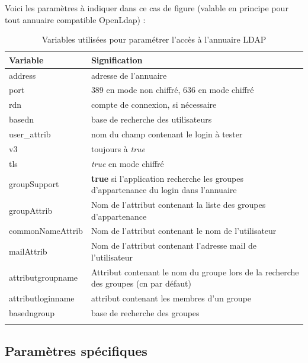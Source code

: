 Voici les paramètres à indiquer dans ce cas de figure (valable en principe pour tout annuaire compatible OpenLdap) : 
\begin{longtable}{|p{4cm}|p{11cm}|}
\hline
\textbf{Variable} & \textbf{Signification} \\
\hline
\endhead
address &  adresse de l'annuaire\\
\hline
port & 389 en mode non chiffré, 636 en mode chiffré\\
\hline
rdn & compte de connexion, si nécessaire \\
\hline
basedn & base de recherche des utilisateurs\\
\hline
user\_attrib & nom du champ contenant le login à tester\\
\hline
v3 & toujours à \textit{true}\\
\hline
tls & \textit{true} en mode chiffré\\
\hline
groupSupport & \textbf{true} si l'application recherche les groupes d'appartenance du login dans l'annuaire\\
\hline
groupAttrib & Nom de l'attribut contenant la liste des groupes d'appartenance\\
\hline
commonNameAttrib & Nom de l'attribut contenant le nom de l'utilisateur\\
\hline
mailAttrib & Nom de l'attribut contenant l'adresse mail de l'utilisateur\\
\hline
attributgroupname & Attribut contenant le nom du groupe lors de la recherche des groupes (cn par défaut)\\
\hline
attributloginname & attribut contenant les membres d'un groupe\\
\hline
basedngroup & base de recherche des groupes \\
\hline
\caption{Variables utilisées pour paramétrer l'accès à l'annuaire LDAP}
\end{longtable}

\subsection{Paramètres spécifiques}
\label{paramspec}


